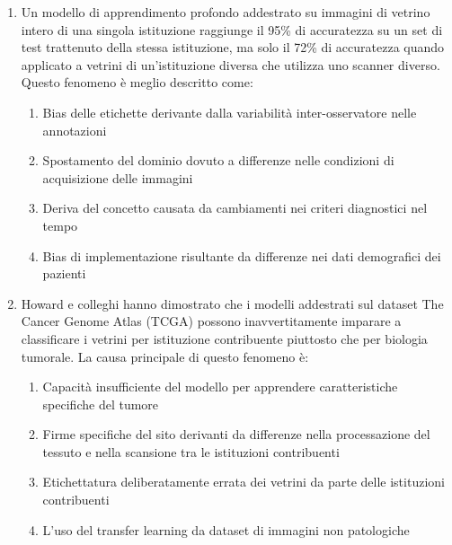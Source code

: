 \begin{enumerate}

    \item \label{ch5:q1} Un modello di apprendimento profondo addestrato su immagini di vetrino intero di una singola istituzione raggiunge il 95\% di accuratezza su un set di test trattenuto della stessa istituzione, ma solo il 72\% di accuratezza quando applicato a vetrini di un'istituzione diversa che utilizza uno scanner diverso. Questo fenomeno è meglio descritto come:
    \begin{enumerate}[label=\Alph*.]
        \item Bias delle etichette derivante dalla variabilità inter-osservatore nelle annotazioni
        \item Spostamento del dominio dovuto a differenze nelle condizioni di acquisizione delle immagini
        \item Deriva del concetto causata da cambiamenti nei criteri diagnostici nel tempo
        \item Bias di implementazione risultante da differenze nei dati demografici dei pazienti
    \end{enumerate}

    \item \label{ch5:q2} Howard e colleghi hanno dimostrato che i modelli addestrati sul dataset The Cancer Genome Atlas (TCGA) possono inavvertitamente imparare a classificare i vetrini per istituzione contribuente piuttosto che per biologia tumorale. La causa principale di questo fenomeno è:
    \begin{enumerate}[label=\Alph*.]
        \item Capacità insufficiente del modello per apprendere caratteristiche specifiche del tumore
        \item Firme specifiche del sito derivanti da differenze nella processazione del tessuto e nella scansione tra le istituzioni contribuenti
        \item Etichettatura deliberatamente errata dei vetrini da parte delle istituzioni contribuenti
        \item L'uso del transfer learning da dataset di immagini non patologiche
    \end{enumerate}


\end{enumerate}
